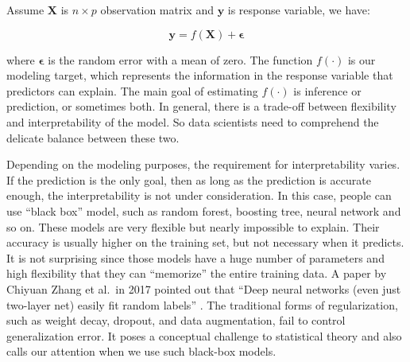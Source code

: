 \documentclass[12pt,]{krantz}
\begin{document}
Assume \(\mathbf{X}\) is \(n \times p\) observation matrix and \(\mathbf{y}\) is response variable, we have:

\begin{equation}
\mathbf{y}=f(\mathbf{X})+\mathbf{\epsilon}
\label{eq:generalmodeleq}
\end{equation}

where \(\mathbf{\epsilon}\) is the random error with a mean of zero. The function \(f(\cdot)\) is our modeling target, which represents the information in the response variable that predictors can explain. The main goal of estimating \(f(\cdot)\) is inference or prediction, or sometimes both. In general, there is a trade-off between flexibility and interpretability of the model. So data scientists need to comprehend the delicate balance between these two.

Depending on the modeling purposes, the requirement for interpretability varies. If the prediction is the only goal, then as long as the prediction is accurate enough, the interpretability is not under consideration. In this case, people can use ``black box'' model, such as random forest, boosting tree, neural network and so on. These models are very flexible but nearly impossible to explain. Their accuracy is usually higher on the training set, but not necessary when it predicts. It is not surprising since those models have a huge number of parameters and high flexibility that they can ``memorize'' the entire training data. A paper by Chiyuan Zhang et al.~in 2017 pointed out that ``Deep neural networks (even just two-layer net) easily fit random labels'' \citep{rethinkDL}. The traditional forms of regularization, such as weight decay, dropout, and data augmentation, fail to control generalization error. It poses a conceptual challenge to statistical theory and also calls our attention when we use such black-box models.
\end{document}

